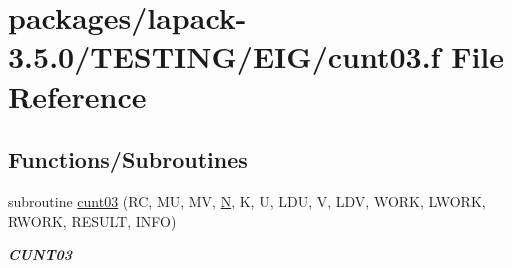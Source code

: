 \hypertarget{cunt03_8f}{}\section{packages/lapack-\/3.5.0/\+T\+E\+S\+T\+I\+N\+G/\+E\+I\+G/cunt03.f File Reference}
\label{cunt03_8f}
\subsection*{Functions/\+Subroutines}
\begin{DoxyCompactItemize}
\item 
subroutine \hyperlink{group__complex__eig_gab5dc85ead2be87d8497fd4f2c4d903d1}{cunt03} (R\+C, M\+U, M\+V, \hyperlink{polmisc_8c_a0240ac851181b84ac374872dc5434ee4}{N}, K, U, L\+D\+U, V, L\+D\+V, W\+O\+R\+K, L\+W\+O\+R\+K, R\+W\+O\+R\+K, R\+E\+S\+U\+L\+T, I\+N\+F\+O)
\begin{DoxyCompactList}\small\item\em {\bfseries C\+U\+N\+T03} \end{DoxyCompactList}\end{DoxyCompactItemize}
